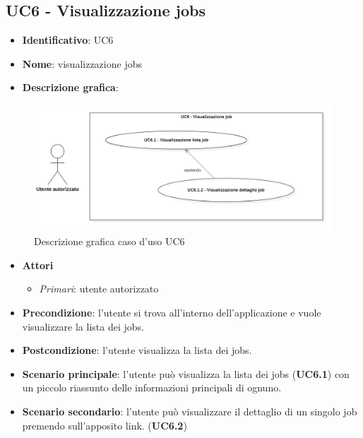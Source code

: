 
\subsection{UC6 - Visualizzazione jobs}
\begin{itemize}
  \item \textbf{Identificativo}: UC6
  \item \textbf{Nome}: visualizzazione \gls{jobs}\glsfirstoccur
  \item \textbf{Descrizione grafica}:
\end{itemize}

\begin{figure}[H]
  \centering
  \includegraphics[width=\textwidth]{immagini/usecase/UC6.png}
  \caption{Descrizione grafica caso d'uso UC6}
\end{figure}

\begin{itemize}
  \item \textbf{Attori}
        \begin{itemize}
          \item \textit{Primari}: utente autorizzato
        \end{itemize}
  \item \textbf{Precondizione}: l'utente si trova all'interno dell'applicazione e vuole visualizzare la lista dei jobs.
  \item \textbf{Postcondizione}: l'utente visualizza la lista dei jobs.
  \item \textbf{Scenario principale}: l'utente può visualizza la lista dei jobs (\textbf{UC6.1}) con un piccolo riassunto delle informazioni principali di ognuno.
  \item \textbf{Scenario secondario}: l'utente può visualizzare il dettaglio di un singolo job premendo sull'apposito link. (\textbf{UC6.2})
\end{itemize}

